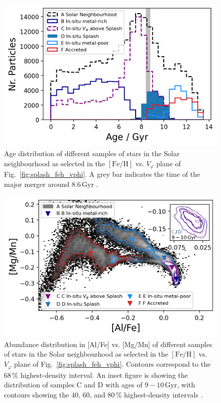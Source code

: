 \documentclass[fleqn,usenatbib]{mnras}
\begin{document}
\begin{figure}
    \centering
    \includegraphics[width=\columnwidth]{figures/splash_age.png}
    \caption{Age distribution of different samples of stars in the Solar neighbourhood as selected in the $\mathrm{[Fe/H]}$ vs. $V_\varphi$ plane of Fig.~\ref{fig:splash_feh_vphi}. A grey bar indicates the time of the major merger around $8.6\,\mathrm{Gyr}$ \href{https://github.com/svenbuder/golden_thread_II/tree/main/figures}{\faGithub}.}
    \label{fig:splash_age}
\end{figure}

\begin{figure}
    \centering
    \includegraphics[width=\columnwidth]{figures/splash_alfe_mgmn_extended.png}
    \caption{Abundance distribution in [Al/Fe] vs. [Mg/Mn] of different samples of stars in the Solar neighbourhood as selected in the $\mathrm{[Fe/H]}$ vs. $V_\varphi$ plane of Fig.~\ref{fig:splash_feh_vphi}. Contours correspond to the 68\,\% highest-density interval. An inset figure is showing the distribution of samples C and D with ages of $9-10\,\mathrm{Gyr}$, with contours showing the 40, 60, and 80\,\% highest-density intervals \href{https://github.com/svenbuder/golden_thread_II/tree/main/figures}{\faGithub}.}
    \label{fig:splash_alfe_mgmn}
\end{figure}
\end{document}
